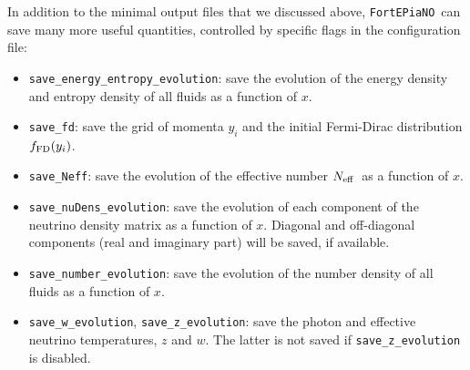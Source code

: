 \documentclass[notitlepage,nofootinbib,showpacs,preprintnumbers,amsmath,amssymb,superscriptaddress,prd,onecolumn]{revtex4-1}
\newcommand{\Neff}{\ensuremath{N_{\rm eff}}}
\newcommand{\fortepiano}{\texttt{FortEPiaNO}}
\begin{document}
In addition to the minimal output files that we discussed above,
\fortepiano\ can save many more useful quantities,
controlled by specific flags in the configuration file:
%
\begin{itemize}
%
\item \texttt{save\_energy\_entropy\_evolution}:
save the evolution of the energy density and entropy density of all fluids as a function of $x$.
%
\item \texttt{save\_fd}: save the grid of momenta $y_i$ and the initial Fermi-Dirac distribution
$f_{\rm FD}(y_i)$.
%
\item \texttt{save\_Neff}: save the evolution of the effective number \Neff\ as a function of $x$.
%
\item \texttt{save\_nuDens\_evolution}:
save the evolution of each component of the neutrino density matrix as a function of $x$.
Diagonal and off-diagonal components (real and imaginary part) will be saved, if available.
%
\item \texttt{save\_number\_evolution}:
save the evolution of the number density of all fluids as a function of $x$.
%
\item \texttt{save\_w\_evolution}, \texttt{save\_z\_evolution}:
save the photon and effective neutrino temperatures, $z$ and $w$.
The latter is not saved if \texttt{save\_z\_evolution} is disabled.
%
\end{itemize}
\end{document}
